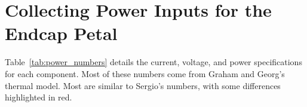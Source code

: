 
\newcommand{\highlight}[1]{{\color{BrickRed}\textbf{#1}}}

\section{Collecting Power Inputs for the Endcap Petal}

Table~\ref{tab:power_numbers} details the current, voltage, and power specifications for each
component. Most of these numbers come from Graham and Georg's thermal model. Most are similar to
Sergio's numbers, with some differences highlighted in red.

\def\tid{\ensuremath{^\text{TID}}\xspace}
\def\eff{\ensuremath{\varepsilon}}
\def\pfeast{\ensuremath{\frac{(1-\eff)}{\eff}(P_\text{ABC}+P_\text{HCC})}}
%
\let\arraystretcha\arraystretch
\renewcommand\arraystretch{1.2} %
